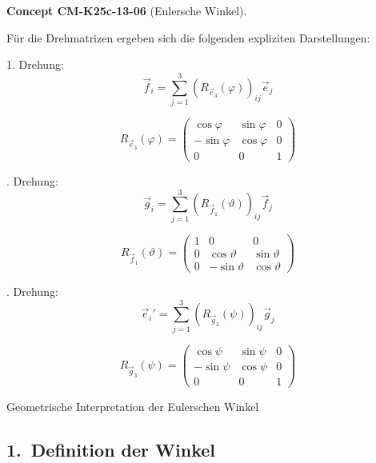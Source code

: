 \documentclass[10pt, letterpaper]{article}
\newcommand{\CustomHeading}[3]{%
  \par\medskip\noindent%
  \textbf{#1 #2} \textnormal{(#3)}.\enskip%
}
\newenvironment{CONC}[2]{\begin{unitbox}\CustomHeading{Concept}{#1}{#2}}{\end{unitbox}}
\begin{document}
\begin{CONC}{CM-K25c-13-06}{Eulersche Winkel}
\begin{center}
\begin{tikzpicture}[every node/.style={font=\normalsize}, scale=1.1]
\end{tikzpicture}
\end{center}
Für die Drehmatrizen ergeben sich die folgenden expliziten Darstellungen:
\noindent

1. Drehung:
\[\vec{f}_i = \sum_{j=1}^3 (R_{\vec{e}_3}(\varphi))_{ij}\vec{e}_j\]

\[R_{\vec{e}_3}(\varphi) = \begin{pmatrix}
\cos\varphi & \sin\varphi & 0 \\
-\sin\varphi & \cos\varphi & 0 \\
0 & 0 & 1
\end{pmatrix}\]

. Drehung:
\[\vec{g}_i = \sum_{j=1}^3 (R_{\vec{f}_1}(\vartheta))_{ij}\vec{f}_j\]

\[R_{\vec{f}_1}(\vartheta) = \begin{pmatrix}
1 & 0 & 0 \\
0 & \cos\vartheta & \sin\vartheta \\
0 & -\sin\vartheta & \cos\vartheta
\end{pmatrix}\]

. Drehung:
\[\vec{e}_i' = \sum_{j=1}^3 (R_{\vec{g}_3}(\psi))_{ij}\vec{g}_j\]

\[R_{\vec{g}_3}(\psi) = \begin{pmatrix}
\cos\psi & \sin\psi & 0 \\
-\sin\psi & \cos\psi & 0 \\
0 & 0 & 1
\end{pmatrix}\]
\end{CONC}






Geometrische Interpretation der Eulerschen Winkel





\subsection*{1.\ Definition der Winkel}
\end{document}
